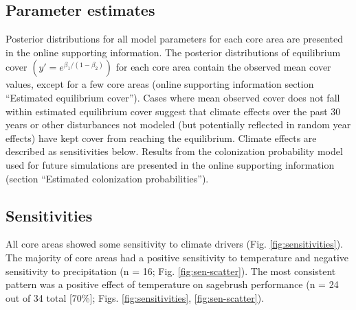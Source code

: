 \documentclass[
  12pt,
]{article}
\begin{document}
\hypertarget{parameter-estimates}{%
\subsection{Parameter estimates}\label{parameter-estimates}}

Posterior distributions for all model parameters for each core area are presented in the online supporting information.
The posterior distributions of equilibrium cover \(\left(y' = e^{\beta_1 / \left(1 - \beta_2 \right)}\right)\) for each core area contain the observed mean cover values, except for a few core areas (online supporting information section ``Estimated equilibrium cover'').
Cases where mean observed cover does not fall within estimated equilibrium cover suggest that climate effects over the past 30 years or other disturbances not modeled (but potentially reflected in random year effects) have kept cover from reaching the equilibrium.
Climate effects are described as sensitivities below.
Results from the colonization probability model used for future simulations are presented in the online supporting information (section ``Estimated colonization probabilities'').

\hypertarget{sensitivities}{%
\subsection{Sensitivities}\label{sensitivities}}

All core areas showed some sensitivity to climate drivers (Fig. \ref{fig:sensitivities}).
The majority of core areas had a positive sensitivity to temperature and negative sensitivity to precipitation (n = 16; Fig. \ref{fig:sen-scatter}).
The most consistent pattern was a positive effect of temperature on sagebrush performance (n = 24 out of 34 total {[}70\%{]}; Figs. \ref{fig:sensitivities}, \ref{fig:sen-scatter}).
\end{document}
